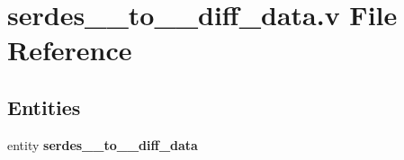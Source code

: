\section{serdes\-\_\-\_\-to\-\_\-\_\-diff\-\_\-data.\-v File Reference}
\label{serdes__1__to__5__diff__data_8v}
\subsection*{Entities}
\begin{DoxyCompactItemize}
\item 
entity {\bf serdes\-\_\-\_\-to\-\_\-\_\-diff\-\_\-data}
\end{DoxyCompactItemize}
